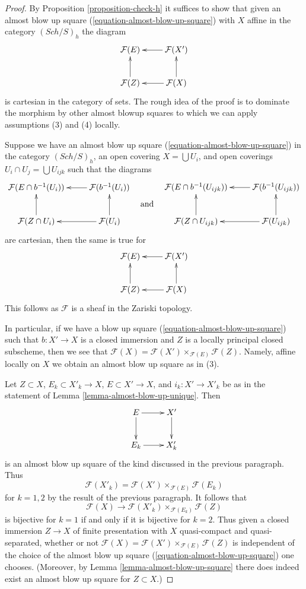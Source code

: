 \documentclass[10pt,a4paper]{amsart}
\theoremstyle{plain}
\theoremstyle{definition}
\theoremstyle{remark}
\numberwithin{equation}{subsection}
\def\Sch{\mathit{Sch}}
\begin{document}
\begin{proof}
By Proposition \ref{proposition-check-h} it suffices to show that given
an almost blow up square (\ref{equation-almost-blow-up-square})
with $X$ affine in the category $(\Sch/S)_h$ the diagram
$$
\xymatrix{
\mathcal{F}(E) & \mathcal{F}(X') \ar[l] \\
\mathcal{F}(Z) \ar[u] & \mathcal{F}(X) \ar[u] \ar[l]
}
$$
is cartesian in the category of sets. The rough idea of the proof
is to dominate the morphism by other almost blowup squares to which
we can apply assumptions (3) and (4) locally.

\medskip\noindent
Suppose we have an almost blow up square
(\ref{equation-almost-blow-up-square}) in the category $(\Sch/S)_h$,
an open covering $X = \bigcup U_i$, and open coverings
$U_i \cap U_j = \bigcup U_{ijk}$ such that the diagrams
$$
\vcenter{
\xymatrix{
\mathcal{F}(E \cap b^{-1}(U_i)) & \mathcal{F}(b^{-1}(U_i)) \ar[l] \\
\mathcal{F}(Z \cap U_i) \ar[u] & \mathcal{F}(U_i) \ar[u] \ar[l]
}
}
\quad\text{and}\quad
\vcenter{
\xymatrix{
\mathcal{F}(E \cap b^{-1}(U_{ijk})) &
\mathcal{F}(b^{-1}(U_{ijk})) \ar[l] \\
\mathcal{F}(Z \cap U_{ijk}) \ar[u] &
\mathcal{F}(U_{ijk}) \ar[u] \ar[l]
}
}
$$
are cartesian, then the same is true for
$$
\xymatrix{
\mathcal{F}(E) & \mathcal{F}(X') \ar[l] \\
\mathcal{F}(Z) \ar[u] & \mathcal{F}(X) \ar[u] \ar[l]
}
$$
This follows as $\mathcal{F}$ is a sheaf in the Zariski topology.

\medskip\noindent
In particular, if we have a blow up square
(\ref{equation-almost-blow-up-square}) such that $b : X' \to X$
is a closed immersion and $Z$ is a locally principal closed
subscheme, then we see that
$\mathcal{F}(X) = \mathcal{F}(X') \times_{\mathcal{F}(E)} \mathcal{F}(Z)$.
Namely, affine locally on $X$ we obtain an almost blow up square as in (3).

\medskip\noindent
Let $Z \subset X$, $E_k \subset X'_k \to X$, $E \subset X' \to X$, and
$i_k : X' \to X'_k$ be as in the statement of
Lemma \ref{lemma-almost-blow-up-unique}. Then
$$
\xymatrix{
E \ar[d] \ar[r] & X' \ar[d] \\
E_k \ar[r] & X'_k
}
$$
is an almost blow up square of the kind discussed in the previous
paragraph. Thus
$$
\mathcal{F}(X'_k) = \mathcal{F}(X') \times_{\mathcal{F}(E)} \mathcal{F}(E_k)
$$
for $k = 1, 2$ by the result of the previous paragraph. It follows that
$$
\mathcal{F}(X) \longrightarrow
\mathcal{F}(X'_k) \times_{\mathcal{F}(E_k)} \mathcal{F}(Z)
$$
is bijective for $k = 1$ if and only if it is bijective for $k = 2$.
Thus given a closed immersion $Z \to X$ of finite presentation
with $X$ quasi-compact and quasi-separated, whether or not
$\mathcal{F}(X) = \mathcal{F}(X') \times_{\mathcal{F}(E)} \mathcal{F}(Z)$
is independent of the choice of the almost blow up square
(\ref{equation-almost-blow-up-square}) one chooses.
(Moreover, by Lemma \ref{lemma-almost-blow-up-square}
there does indeed exist an almost
blow up square for $Z \subset X$.)


\end{proof}
\end{document}
